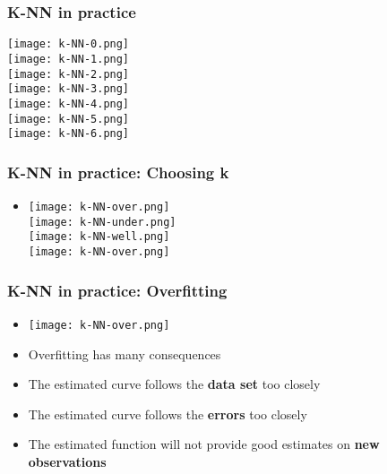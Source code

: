 \documentclass[xcolor=x11names,compress, aspectratio=169]{beamer}
\renewcommand{\(}{\begin{columns}}
\renewcommand{\)}{\end{columns}}
\newcommand{\<}[1]{\begin{column}{#1}}
\renewcommand{\>}{\end{column}}
\begin{document}
\begin{frame}
\frametitle{\textcolor{brique}{ K-NN in practice}}
\begin{center}
\begin{itemize}
    {\texttt{[image: k-NN-0.png]} \\ }
    {\texttt{[image: k-NN-1.png]} \\ }
    {\texttt{[image: k-NN-2.png]} \\ }
    {\texttt{[image: k-NN-3.png]} \\ }
    {\texttt{[image: k-NN-4.png]} \\ }
    {\texttt{[image: k-NN-5.png]} \\ }
    {\texttt{[image: k-NN-6.png]} \\ }
\end{itemize}
\end{center}
\end{frame}

\begin{frame}
\frametitle{\textcolor{brique}{ K-NN in practice: \textbf{Choosing k}}}
\begin{itemize}
\item[]
    {\texttt{[image: k-NN-over.png]} \\ }
    {\texttt{[image: k-NN-under.png]} \\ }
    {\texttt{[image: k-NN-well.png]} \\ }
    {\texttt{[image: k-NN-over.png]} \\ }
\end{itemize}
\end{frame}


\begin{frame}
\frametitle{\textcolor{brique}{ K-NN in practice: \textbf{Overfitting}}}
\begin{itemize}[<+->]
\item[] \texttt{[image: k-NN-over.png]}
\item[] Overfitting has many consequences
\item The estimated curve follows the \textbf{data set} too closely
\item The estimated curve follows the \textbf{errors} too closely
\item The estimated function will not provide good estimates on \textbf{new observations}
\end{itemize}
\end{frame}
\end{document}
